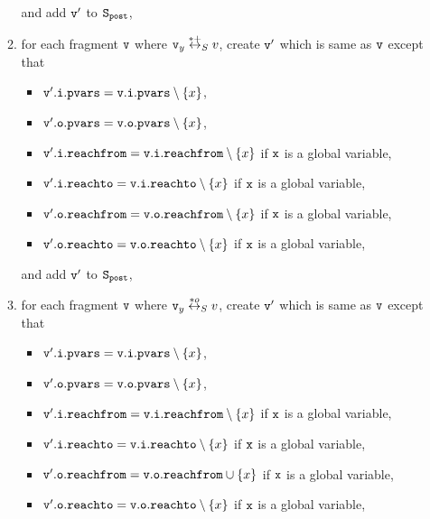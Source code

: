 \begin{itemize}
\begin{enumerate}
\begin{itemize}
\end{itemize}
and add $\tt v'$ to $\tt S_{post}$,
\item for each fragment $\tt v$ where $\mathtt{v}_y \overset{*+}\leftrightarrow_S v$, create $\tt v'$ which is same as $\tt v$ except that
\begin{itemize}
\item $\mathtt{v}'.\mathtt{i}.\mathtt{pvars} = \mathtt{v}.\mathtt{i}.\mathtt{pvars} \setminus \left\{x\right\}$,
\item $\mathtt{v}'.\mathtt{o}.\mathtt{pvars} = \mathtt{v}.\mathtt{o}.\mathtt{pvars} \setminus \left\{x\right\}$,
\item $\mathtt{v}'.\mathtt{i}.\mathtt{reachfrom} = \mathtt{v}.\mathtt{i}.\mathtt{reachfrom} \setminus \left\{x\right\}$ if $\tt x$ is a global variable,
\item $\mathtt{v}'.\mathtt{i}.\mathtt{reachto} = \mathtt{v}.\mathtt{i}.\mathtt{reachto} \setminus \left\{x\right\}$ if $\tt x$ is a global variable,
\item $\mathtt{v}'.\mathtt{o}.\mathtt{reachfrom} = \mathtt{v}.\mathtt{o}.\mathtt{reachfrom} \setminus \left\{x\right\}$ if $\tt x$ is a global variable,
\item $\mathtt{v}'.\mathtt{o}.\mathtt{reachto} = \mathtt{v}.\mathtt{o}.\mathtt{reachto} \setminus \left\{x\right\}$ if $\tt x$ is a global variable,
\end{itemize}
and add $\tt v'$ to $\tt S_{post}$,
\item for each fragment $\tt v$ where $\mathtt{v}_y \overset{*o}\leftrightarrow_S v$, create $\tt v'$ which is same as $\tt v$ except that
\begin{itemize}
\item $\mathtt{v}'.\mathtt{i}.\mathtt{pvars} = \mathtt{v}.\mathtt{i}.\mathtt{pvars} \setminus \left\{x\right\}$,
\item $\mathtt{v}'.\mathtt{o}.\mathtt{pvars} = \mathtt{v}.\mathtt{o}.\mathtt{pvars} \setminus \left\{x\right\}$,
\item $\mathtt{v}'.\mathtt{i}.\mathtt{reachfrom} = \mathtt{v}.\mathtt{i}.\mathtt{reachfrom} \setminus \left\{x\right\}$ if $\tt x$ is a global variable,
\item $\mathtt{v}'.\mathtt{i}.\mathtt{reachto} = \mathtt{v}.\mathtt{i}.\mathtt{reachto} \setminus \left\{x\right\}$ if $\tt x$ is a global variable,
\item $\mathtt{v}'.\mathtt{o}.\mathtt{reachfrom} = \mathtt{v}.\mathtt{o}.\mathtt{reachfrom} \cup \left\{x\right\}$ if $\tt x$ is a global variable,
\item $\mathtt{v}'.\mathtt{o}.\mathtt{reachto} = \mathtt{v}.\mathtt{o}.\mathtt{reachto} \setminus \left\{x\right\}$ if $\tt x$ is a global variable,


\end{itemize}
\end{enumerate}
\end{itemize}
